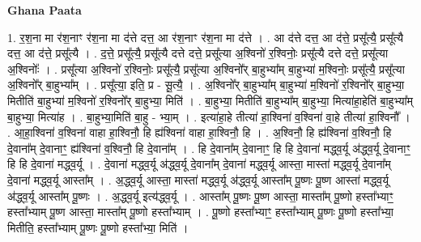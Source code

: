 \documentclass[17pt]{extarticle}
\begin{document}
\textbf{Ghana Paata } \newline

1. र॒श॒ना मा र॑श॒नाꣳ र॑श॒ना मा द॑त्ते दत्त॒ आ र॑श॒नाꣳ र॑श॒ना मा द॑त्ते । . आ द॑त्ते दत्त॒ आ द॑त्ते॒ प्रसू᳚त्यै॒ प्रसू᳚त्यै दत्त॒ आ द॑त्ते॒ प्रसू᳚त्यै । . द॒त्ते॒ प्रसू᳚त्यै॒ प्रसू᳚त्यै दत्ते दत्ते॒ प्रसू᳚त्या अ॒श्विनो॑ र॒श्विनोः॒ प्रसू᳚त्यै दत्ते दत्ते॒ प्रसू᳚त्या अ॒श्विनोः᳚ । . प्रसू᳚त्या अ॒श्विनो॑ र॒श्विनोः॒ प्रसू᳚त्यै॒ प्रसू᳚त्या अ॒श्विनो᳚र् बा॒हुभ्या᳚म् बा॒हुभ्या॑ म॒श्विनोः॒ प्रसू᳚त्यै॒ प्रसू᳚त्या अ॒श्विनो᳚र् बा॒हुभ्या᳚म् । . प्रसू᳚त्या॒ इति॒ प्र - सू॒त्यै॒ । . अ॒श्विनो᳚र् बा॒हुभ्या᳚म् बा॒हुभ्या॑ म॒श्विनो॑ र॒श्विनो᳚र् बा॒हुभ्या॒ मितीति॑ बा॒हुभ्या॑ म॒श्विनो॑ र॒श्विनो᳚र् बा॒हुभ्या॒ मिति॑ । . बा॒हुभ्या॒ मितीति॑ बा॒हुभ्या᳚म् बा॒हुभ्या॒ मित्या॑हा॒हेति॑ बा॒हुभ्या᳚म् बा॒हुभ्या॒ मित्या॑ह । . बा॒हुभ्या॒मिति॑ बा॒हु - भ्या॒म् । . इत्या॑हा॒हे तीत्या॑ हा॒श्विना॑ व॒श्विना॑ वा॒हे तीत्या॑ हा॒श्विनौ᳚ । . आ॒हा॒श्विना॑ व॒श्विना॑ वाहा हा॒श्विनौ॒ हि ह्य॑श्विना॑ वाहा हा॒श्विनौ॒ हि । . अ॒श्विनौ॒ हि ह्य॑श्विना॑ व॒श्विनौ॒ हि दे॒वाना᳚म् दे॒वानाꣳ॒॒ ह्य॑श्विना॑ व॒श्विनौ॒ हि दे॒वाना᳚म् । . हि दे॒वाना᳚म् दे॒वानाꣳ॒॒ हि हि दे॒वाना॑ मद्ध्व॒र्यू अ॑द्ध्व॒र्यू दे॒वानाꣳ॒॒ हि हि दे॒वाना॑ मद्ध्व॒र्यू । . दे॒वाना॑ मद्ध्व॒र्यू अ॑द्ध्व॒र्यू दे॒वाना᳚म् दे॒वाना॑ मद्ध्व॒र्यू आस्ता॒ मास्ता॑ मद्ध्व॒र्यू दे॒वाना᳚म् दे॒वाना॑ मद्ध्व॒र्यू आस्ता᳚म् । . अ॒द्ध्व॒र्यू आस्ता॒ मास्ता॑ मद्ध्व॒र्यू अ॑द्ध्व॒र्यू आस्ता᳚म् पू॒ष्णः पू॒ष्ण आस्ता॑ मद्ध्व॒र्यू अ॑द्ध्व॒र्यू आस्ता᳚म् पू॒ष्णः । . अ॒द्ध्व॒र्यू इत्य॑द्ध्व॒र्यू । . आस्ता᳚म् पू॒ष्णः पू॒ष्ण आस्ता॒ मास्ता᳚म् पू॒ष्णो हस्ता᳚भ्याꣳ॒॒ हस्ता᳚भ्याम् पू॒ष्ण आस्ता॒ मास्ता᳚म् पू॒ष्णो हस्ता᳚भ्याम् । . पू॒ष्णो हस्ता᳚भ्याꣳ॒॒ हस्ता᳚भ्याम् पू॒ष्णः पू॒ष्णो हस्ता᳚भ्या॒ मितीति॒ हस्ता᳚भ्याम् पू॒ष्णः पू॒ष्णो हस्ता᳚भ्या॒ मिति॑ । \newline
\end{document}
